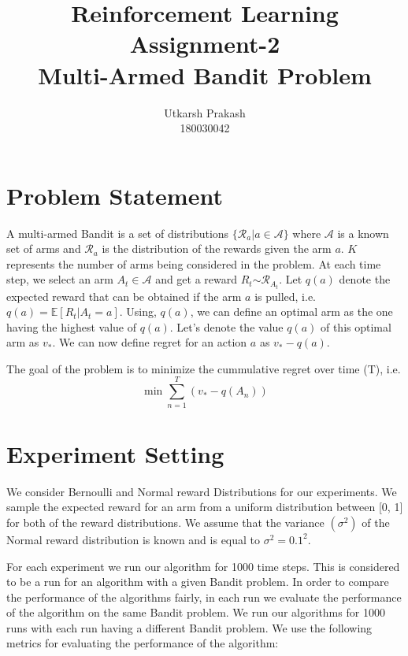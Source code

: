 \documentclass{article}
\title{Reinforcement Learning Assignment-2 \\
	\Large Multi-Armed Bandit Problem \\}
\begin{document}
\author{Utkarsh Prakash \\ \normalsize 180030042}
\maketitle
\section{Problem Statement}
	A multi-armed Bandit is a set of distributions $\{\mathcal{R}_{a} | a \in \mathcal{A}\}$ where $\mathcal{A}$ is a known set of arms and $\mathcal{R}_{a}$ is the
	distribution of the rewards given the arm $a$. $K$ represents the number of arms being considered in the problem. At each time step, we select an arm 
	$A_{t} \in \mathcal{A}$ and get a reward $R_{t} \stackrel{}{\sim}
	\mathcal{R}_{A_{t}}$. Let $q(a)$ denote the expected reward that can be obtained if the arm $a$ is pulled, i.e. $q(a) = \mathbb{E}[R_{t} | A_{t} = a]$. Using,
	$q(a)$, we can define an optimal arm as the one having the highest value of $q(a)$. Let's denote the value $q(a)$ of this optimal arm as $v_{*}$. We can now 
	define regret for an action $a$ as $v_{*} - q(a)$. \par

	\noindent %
	The goal of the problem is to minimize the cummulative regret over time (T), i.e.
	\begin{equation}
	\nonumber
		\min \sum_{n=1}^{T} (v_{*} - q(A_{n}))
	\end{equation}
\section{Experiment Setting}
	We consider Bernoulli and Normal reward Distributions for our experiments. We sample the expected reward for an arm from a uniform distribution between [0, 1] for both of the  
	reward distributions. We assume that the variance $(\sigma^{2})$ of the Normal reward distribution is known and is equal to $\sigma^{2} = 0.1^{2}$. \par
	
	\noindent %
	For each experiment we run our algorithm for 1000 time steps. This is considered to be a run for an algorithm with a given Bandit problem. In order to compare
	the performance of the algorithms fairly, in each run we evaluate the performance of the algorithm on the same Bandit problem. We run our algorithms for 1000
	runs with each run having a different Bandit problem. We use the following metrics for evaluating the performance of the algorithm:
	
\end{document}
